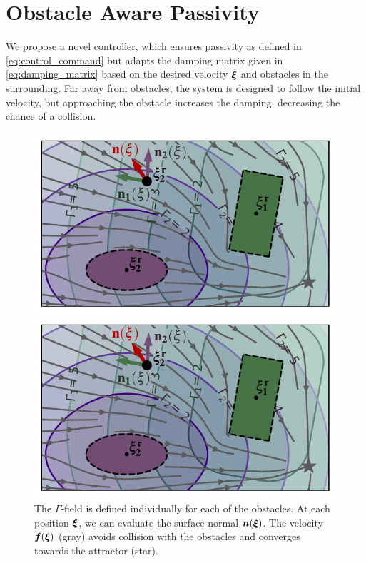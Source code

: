 \section{Obstacle Aware Passivity} \label{sec:obstacle_aware_passivity}
We propose a novel controller, which ensures passivity as defined in \eqref{eq:control_command} but adapts the damping matrix given in \eqref{eq:damping_matrix} based on the desired velocity $\dot{\boldsymbol{\xi}}$ and obstacles in the surrounding. 
Far away from obstacles, the system is designed to follow the initial velocity, but approaching the obstacle increases the damping, decreasing the chance of a collision.

\ifthesis
\begin{figure}
	\ifthesis
\centerline{\includegraphics[width=0.7\columnwidth]{figures/normal_and_gamma_field_visualization_annotated.pdf}}
\else
\centerline{\includegraphics[width=1.0\columnwidth]{figures/normal_and_gamma_field_visualization_annotated.pdf}}
\fi
\caption{
The $\Gamma$-field is defined individually for each of the obstacles. At each position $\boldsymbol{\xi}$, we can evaluate the surface normal $\boldsymbol{n}(\boldsymbol{\xi})$. 
The velocity $\boldsymbol{f}(\boldsymbol{\xi})$ (gray) avoids collision with the obstacles and converges towards the attractor (star).}
\label{fig:resultant_normal}
\end{figure}
\fi


